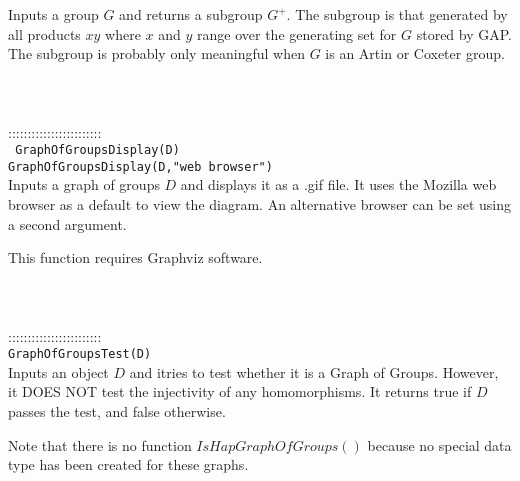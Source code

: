 \documentclass[a4paper,11pt]{report}
\begin{document}
{ Inputs a group $G$ and returns a subgroup $G^+$. The subgroup is that generated by all products $xy$ where $x$ and $y$ range over the generating set for $G$ stored by GAP. The subgroup is probably only meaningful when $G$ is an Artin or Coxeter group. \\
 \\
 \\
 \\
 ::::::::::::::::::::::::\\
 \texttt{ GraphOfGroupsDisplay(D) }\\
 \texttt{GraphOfGroupsDisplay(D,"web browser") }\\
 

 Inputs a graph of groups $D$ and displays it as a .gif file. It uses the Mozilla web browser as a default
to view the diagram. An alternative browser can be set using a second
argument. 

 This function requires Graphviz software. \\
 \\
 \\
 \\
 ::::::::::::::::::::::::\\
 \texttt{GraphOfGroupsTest(D) }\\
 

 Inputs an object $D$ and itries to test whether it is a Graph of Groups. However, it DOES NOT test
the injectivity of any homomorphisms. It returns true if $D$ passes the test, and false otherwise. 

 Note that there is no function $IsHapGraphOfGroups()$ because no special data type has been created for these graphs. \\
 \\
 \\
 }

 
\end{document}
